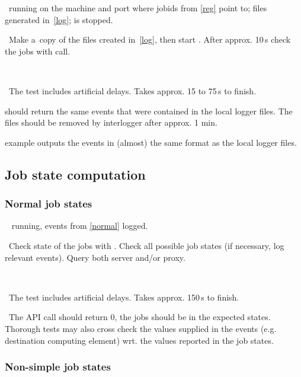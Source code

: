 \req\ running  on the machine and port where
jobids from \ref{reg} point to; files generated in~\ref{log};
 is stopped.

\what\ Make a~copy of the files created in~\ref{log}, then start
. After approx. 10\,s check the jobs
with  call.

\how\ 

\note\ The test includes artificial delays. Takes approx. 15 to 75\,s to finish.

\result {} should return the same events that were
contained in the local logger files. The files should be removed by
interlogger after approx. 1 min.

\begin{hints}
 example outputs the events in (almost) the same
format as the local logger files.
\end{hints}




\subsection{Job state computation}

\subsubsection{Normal job states}
\label{state}

\req\  running, events from \ref{normal} logged.

\what\ Check state of the jobs with . Check all possible job states 
(if necessary, log relevant events). Query both server and/or proxy.

\how\ 

\note\ The test includes artificial delays. Takes approx. 150\,s to finish.

\result\ The API call should return 0, the jobs should be in the expected
states. Thorough tests may also cross check the values supplied in the
events (e.g. destination computing element) wrt. the values reported in the job states.




\subsubsection{Non-simple job states}



